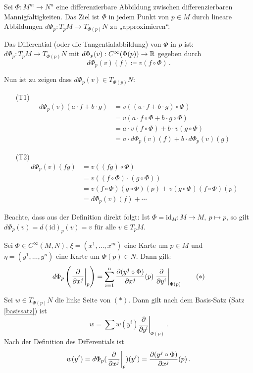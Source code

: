 \documentclass[a4paper,twoside,DIV15,BCOR12mm]{scrbook}
\renewcommand{\da}{\coloneqq}
\begin{document}
Sei $\Phi:M^m\to N^n$ eine differenzierbare Abbildung zwischen differenzierbaren Mannigfaltigkeiten. Das Ziel ist $\Phi$ in jedem Punkt von $p\in M$ durch lineare Abbildungen $d\Phi_p: T_pM \to T_{\Phi(p)}N$ zu „approximieren“. 

\begin{definition}
Das Differential (oder die Tangentialabbildung) von $\Phi$ in $p$ ist:
$ d\Phi_p : T_pM \to T_{\Phi(p)}N $ mit $d\Phi_p(v) : C^\infty(\Phi(p)) \to \mathbb{R}$ gegeben durch
\[ d\Phi_p(v)(f) \da v(f \circ \Phi)\,. \]
\end{definition}

Nun ist zu zeigen dass $d\Phi_p(v) \in T_{\Phi(p)}N$:
\begin{itemize}
\item[(T1)]
\begin{align*}
d\Phi_p(v)(a\cdot f + b\cdot g) 
&= v( (a\cdot f+b\cdot g) \circ \Phi) \\
&=v(a\cdot f \circ \Phi + b\cdot g \circ \Phi) \\
&=a\cdot v(f\circ \Phi) + b\cdot v(g\circ \Phi) \\
&=a\cdot d\Phi_p(v)(f) + b\cdot d\Phi_p(v)(g)
\end{align*}
\item[(T2)]
\begin{align*}
d\Phi_p(v)(fg) 
&= v( (fg)\circ \Phi) \\
&= v( (f\circ \Phi)\cdot(g\circ\Phi) ) \\
&= v(f\circ \Phi)(g\circ \Phi)(p) + v(g\circ \Phi)(f\circ \Phi)(p) \\
&= d\Phi_p(v)(f) + \cdots 
\end{align*}
\end{itemize}

Beachte, dass aus der Definition direkt folgt: Ist $\Phi = \text{id}_M: M\to M,\> p\mapsto p$, so gilt $d\Phi_p(v) = d(\text{id})_p(v) = v$ für alle $v\in T_pM$.

\begin{lemma}
\label{lem3}
Sei $\Phi \in C^\infty(M,N)$, $\xi = (x^1,\ldots,x^m)$ eine Karte um $p\in M$ und $\eta = (y^1,\ldots,y^n)$ eine Karte um $\Phi(p)\in N$. Dann gilt:
\[
d\Phi_p\left(\left.\frac{\partial}{\partial x^{j}}\right|_p\right) = \sum_{i=1}^n \frac{ \partial(y^j\circ \Phi)}{\partial x^j}(p) \left.\frac{\partial}{\partial y^i}\right|_{\Phi(p)} \qquad (*)
\]
\end{lemma}

\begin{beweis}
Sei $w\in T_{\Phi(p)}N$ die linke Seite von $(*)$. Dann gilt nach dem Basis-Satz (Satz \ref{basissatz}) ist 
\[ w = \sum w(y^i) \left.\frac{\partial}{\partial y^i}\right|_{\Phi(p)}\,.\]
Nach der Definition des Differentials ist
\[ w(y^i) = d\Phi_p(\left.\frac{\partial}{\partial x^{j}}\right|_p)(y^i) = \frac{\partial(y^j\circ \Phi)}{\partial x^j}(p)\,.\]
\end{beweis}
\end{document}
